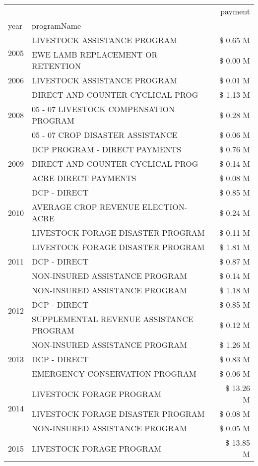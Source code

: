 \begin{tabular}{llr}
\toprule
 &  & payment \\
year & programName &  \\
\midrule
\multirow[t]{2}{*}{2005} & LIVESTOCK ASSISTANCE PROGRAM & \$ 0.65 M \\
 & EWE LAMB REPLACEMENT OR RETENTION & \$ 0.00 M \\
\cline{1-3}
2006 & LIVESTOCK ASSISTANCE PROGRAM & \$ 0.01 M \\
\cline{1-3}
\multirow[t]{3}{*}{2008} & DIRECT AND COUNTER CYCLICAL PROG & \$ 1.13 M \\
 & 05 - 07 LIVESTOCK COMPENSATION PROGRAM & \$ 0.28 M \\
 & 05 - 07 CROP DISASTER ASSISTANCE & \$ 0.06 M \\
\cline{1-3}
\multirow[t]{3}{*}{2009} & DCP PROGRAM - DIRECT PAYMENTS & \$ 0.76 M \\
 & DIRECT AND COUNTER CYCLICAL PROG & \$ 0.14 M \\
 & ACRE DIRECT PAYMENTS & \$ 0.08 M \\
\cline{1-3}
\multirow[t]{3}{*}{2010} & DCP - DIRECT & \$ 0.85 M \\
 & AVERAGE CROP REVENUE ELECTION-ACRE & \$ 0.24 M \\
 & LIVESTOCK FORAGE DISASTER PROGRAM & \$ 0.11 M \\
\cline{1-3}
\multirow[t]{3}{*}{2011} & LIVESTOCK FORAGE DISASTER PROGRAM & \$ 1.81 M \\
 & DCP - DIRECT & \$ 0.87 M \\
 & NON-INSURED ASSISTANCE PROGRAM & \$ 0.14 M \\
\cline{1-3}
\multirow[t]{3}{*}{2012} & NON-INSURED ASSISTANCE PROGRAM & \$ 1.18 M \\
 & DCP - DIRECT & \$ 0.85 M \\
 & SUPPLEMENTAL REVENUE ASSISTANCE PROGRAM & \$ 0.12 M \\
\cline{1-3}
\multirow[t]{3}{*}{2013} & NON-INSURED ASSISTANCE PROGRAM & \$ 1.26 M \\
 & DCP - DIRECT & \$ 0.83 M \\
 & EMERGENCY CONSERVATION PROGRAM & \$ 0.06 M \\
\cline{1-3}
\multirow[t]{3}{*}{2014} & LIVESTOCK FORAGE PROGRAM & \$ 13.26 M \\
 & LIVESTOCK FORAGE DISASTER PROGRAM & \$ 0.08 M \\
 & NON-INSURED ASSISTANCE PROGRAM & \$ 0.05 M \\
\cline{1-3}
\multirow[t]{3}{*}{2015} & LIVESTOCK FORAGE PROGRAM & \$ 13.85 M \\

\end{tabular}
